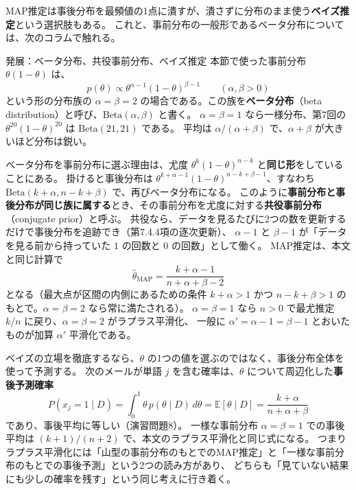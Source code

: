 MAP推定は事後分布を最頻値の1点に潰すが、潰さずに分布のまま使う\textbf{ベイズ推定}という選択肢もある。
これと、事前分布の一般形であるベータ分布については、次のコラムで触れる。

\begin{mlcolumn}{発展：ベータ分布、共役事前分布、ベイズ推定}
本節で使った事前分布 $\theta(1 - \theta)$ は、
\begin{equation}
  p(\theta) \propto \theta^{\alpha - 1}(1 - \theta)^{\beta - 1}
  \qquad (\alpha, \beta > 0)
  \label{eq:ch8-beta-general}
\end{equation}
という形の分布族の $\alpha = \beta = 2$ の場合である。この族を\textbf{ベータ分布}（beta distribution）と呼び、$\mathrm{Beta}(\alpha, \beta)$ と書く。
$\alpha = \beta = 1$ なら一様分布、第7回の $\theta^{20}(1 - \theta)^{20}$ は $\mathrm{Beta}(21, 21)$ である。
平均は $\alpha/(\alpha + \beta)$ で、$\alpha + \beta$ が大きいほど分布は鋭い。

ベータ分布を事前分布に選ぶ理由は、尤度 $\theta^k(1 - \theta)^{n-k}$ と\textbf{同じ形}をしていることにある。
掛けると事後分布は $\theta^{k + \alpha - 1}(1 - \theta)^{n - k + \beta - 1}$、すなわち $\mathrm{Beta}(k + \alpha, n - k + \beta)$ で、再びベータ分布になる。
このように\textbf{事前分布と事後分布が同じ族に属する}とき、その事前分布を尤度に対する\textbf{共役事前分布}（conjugate prior）と呼ぶ。
共役なら、データを見るたびに2つの数を更新するだけで事後分布を追跡でき（第7.4.4項の逐次更新）、
$\alpha - 1$ と $\beta - 1$ が「データを見る前から持っていた $1$ の回数と $0$ の回数」として働く。
MAP推定は、本文と同じ計算で
\begin{equation}
  \hat{\theta}_{\mathrm{MAP}} = \frac{k + \alpha - 1}{n + \alpha + \beta - 2}
  \label{eq:ch8-beta-map}
\end{equation}
となる（最大点が区間の内側にあるための条件 $k + \alpha > 1$ かつ $n - k + \beta > 1$ のもとで。$\alpha = \beta = 2$ なら常に満たされる）。
$\alpha = \beta = 1$ なら $n > 0$ で最尤推定 $k/n$ に戻り、$\alpha = \beta = 2$ がラプラス平滑化、
一般に $\alpha' = \alpha - 1 = \beta - 1$ とおいたものが加算 $\alpha'$ 平滑化である。

ベイズの立場を徹底するなら、$\theta$ の1つの値を選ぶのではなく、事後分布全体を使って予測する。
次のメールが単語 $j$ を含む確率は、$\theta$ について周辺化した\textbf{事後予測確率}
\begin{equation}
  P(x_j = 1 \mid D) = \int_0^1 \theta\,p(\theta \mid D)\,d\theta = \mathbb{E}[\theta \mid D] = \frac{k + \alpha}{n + \alpha + \beta}
  \label{eq:ch8-predictive}
\end{equation}
であり、事後平均に等しい（演習問題8）。
一様な事前分布 $\alpha = \beta = 1$ での事後平均は $(k + 1)/(n + 2)$ で、本文のラプラス平滑化と同じ式になる。
つまりラプラス平滑化には「山型の事前分布のもとでのMAP推定」と「一様な事前分布のもとでの事後予測」という2つの読み方があり、
どちらも「見ていない結果にも少しの確率を残す」という同じ考えに行き着く。


\end{mlcolumn}
